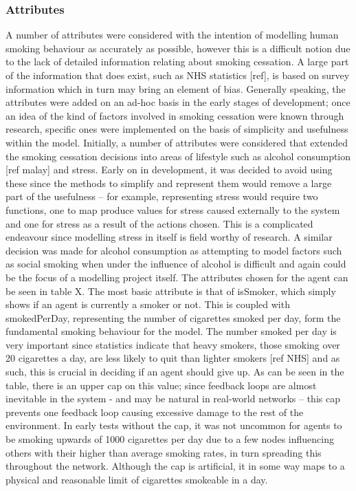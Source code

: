 \documentclass[]{report}
\begin{document}
\subsubsection{Attributes}
A number of attributes were considered with the intention of modelling human smoking behaviour as accurately as possible, however this is a difficult notion due to the lack of detailed information relating about smoking cessation. A large part of the information that does exist, such as NHS statistics [ref], is based on survey information which in turn may bring an element of bias. Generally speaking, the attributes were added on an ad-hoc basis in the early stages of development; once an idea of the kind of factors involved in smoking cessation were known through research, specific ones were implemented on the basis of simplicity and usefulness within the model.
Initially, a number of attributes were considered that extended the smoking cessation decisions into areas of lifestyle such as alcohol consumption [ref malay] and stress. Early on in development, it was decided to avoid using these since the methods to simplify and represent them would remove a large part of the usefulness – for example, representing stress would require two functions, one to map produce values for stress caused externally to the system and one for stress as a result of the actions chosen. This is a complicated endeavour since modelling stress in itself is field worthy of research. A similar decision was made for alcohol consumption as attempting to model factors such as social smoking when under the influence of alcohol is difficult and again could be the focus of a modelling project itself.
The attributes chosen for the agent can be seen in table X. 
The most basic attribute is that of isSmoker, which simply shows if an agent is currently a smoker or not. This is coupled with smokedPerDay, representing the number of cigarettes smoked per day, form the fundamental smoking behaviour for the model. The number smoked per day is very important since statistics indicate that heavy smokers, those smoking over 20 cigarettes a day, are less likely to quit than lighter smokers [ref NHS] and as such, this is crucial in deciding if an agent should give up. As can be seen in the table, there is an upper cap on this value; since feedback loops are almost inevitable in the system  - and may be natural in real-world networks – this cap prevents one feedback loop causing excessive damage to the rest of the environment. In early tests without the cap, it was not uncommon for agents to be smoking upwards of 1000 cigarettes per day due to a few nodes influencing others with their higher than average smoking rates, in turn spreading this throughout the network. Although the cap is artificial, it in some way maps to a physical and reasonable limit of cigarettes smokeable in a day.
\end{document}
